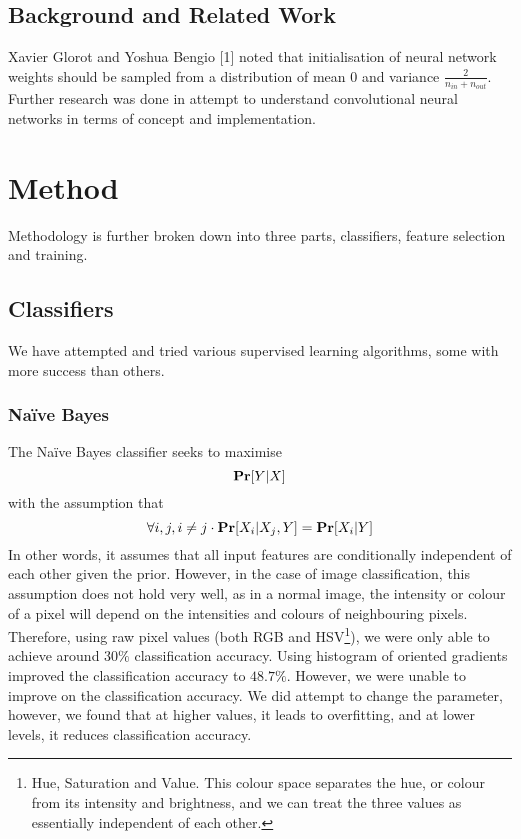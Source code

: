 \documentclass{article} %
\begin{document}
\subsection{Background and Related Work}

Xavier Glorot and Yoshua Bengio [1] noted that initialisation of neural network weights should be sampled from a distribution of mean 0 and variance $\frac{2}{n_{in}+n_{out}}$.
Further research was done in attempt to understand convolutional neural networks in terms of concept and implementation.



\section{Method}
Methodology is further broken down into three parts, classifiers, feature selection and training.

\subsection{Classifiers}
We have attempted and tried various supervised learning algorithms, some with more success than others.

\subsubsection{Na\"ive Bayes}
The Na\"ive Bayes classifier seeks to maximise
$$\mathbf{Pr}[{Y|X}]$$
with the assumption that
$$\forall i,j,  i\neq j \cdot \mathbf{Pr}[{X_i|X_j, Y}]=\mathbf{Pr}[{X_i|Y}]$$
In other words, it assumes that all input features are conditionally independent of each other given the prior. However, in the case of image classification, this assumption does
not hold very well, as in a normal image, the intensity or colour of a pixel will depend on the intensities and colours of neighbouring pixels. Therefore, using raw pixel values (both 
RGB and HSV\footnote{Hue, Saturation and Value. This colour space separates the hue, or colour from its intensity and brightness, and we can treat the three values as essentially independent of each other.}), we were only able to achieve around $30\%$ classification accuracy. Using histogram of oriented gradients improved the classification accuracy to $48.7\%$. However, we
were unable to improve on the classification accuracy. We did attempt to change the  parameter, however, we found that at higher values, it leads to overfitting, and
at lower levels, it reduces classification accuracy.
\end{document}
